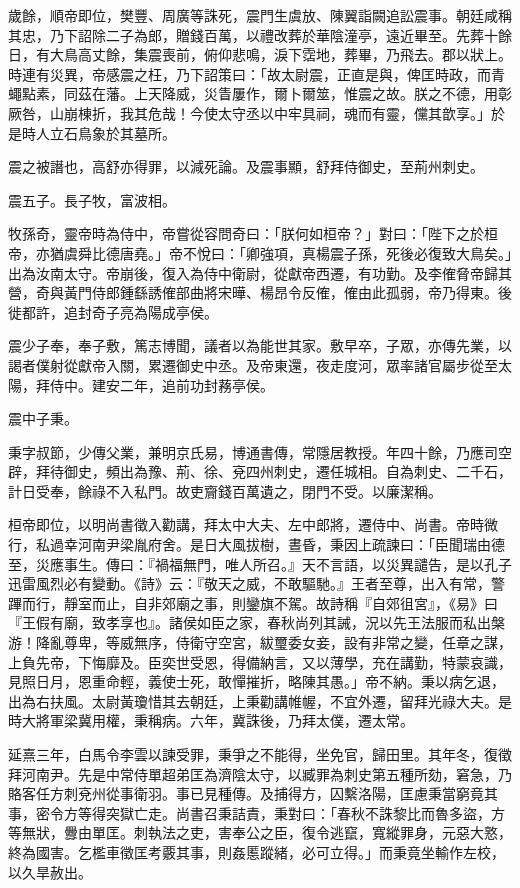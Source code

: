 \begin{pinyinscope}
歲餘，順帝即位，樊豐、周廣等誅死，震門生虞放、陳翼詣闕追訟震事。朝廷咸稱其忠，乃下詔除二子為郎，贈錢百萬，以禮改葬於華陰潼亭，遠近畢至。先葬十餘日，有大鳥高丈餘，集震喪前，俯仰悲鳴，淚下霑地，葬畢，乃飛去。郡以狀上。時連有災異，帝感震之枉，乃下詔策曰：「故太尉震，正直是與，俾匡時政，而青蠅點素，同茲在藩。上天降威，災眚屢作，爾卜爾筮，惟震之故。朕之不德，用彰厥咎，山崩棟折，我其危哉！今使太守丞以中牢具祠，魂而有靈，儻其歆享。」於是時人立石鳥象於其墓所。

震之被譖也，高舒亦得罪，以減死論。及震事顯，舒拜侍御史，至荊州刺史。

震五子。長子牧，富波相。

牧孫奇，靈帝時為侍中，帝嘗從容問奇曰：「朕何如桓帝？」對曰：「陛下之於桓帝，亦猶虞舜比德唐堯。」帝不悅曰：「卿強項，真楊震子孫，死後必復致大鳥矣。」出為汝南太守。帝崩後，復入為侍中衛尉，從獻帝西遷，有功勤。及李傕脅帝歸其營，奇與黃門侍郎鍾繇誘傕部曲將宋曄、楊昂令反傕，傕由此孤弱，帝乃得東。後徙都許，追封奇子亮為陽成亭侯。

震少子奉，奉子敷，篤志博聞，議者以為能世其家。敷早卒，子眾，亦傳先業，以謁者僕射從獻帝入關，累遷御史中丞。及帝東還，夜走度河，眾率諸官屬步從至太陽，拜侍中。建安二年，追前功封蓩亭侯。

震中子秉。

秉字叔節，少傳父業，兼明京氏易，博通書傳，常隱居教授。年四十餘，乃應司空辟，拜待御史，頻出為豫、荊、徐、兗四州刺史，遷任城相。自為刺史、二千石，計日受奉，餘祿不入私門。故吏齎錢百萬遺之，閉門不受。以廉潔稱。

桓帝即位，以明尚書徵入勸講，拜太中大夫、左中郎將，遷侍中、尚書。帝時微行，私過幸河南尹梁胤府舍。是日大風拔樹，晝昏，秉因上疏諫曰：「臣聞瑞由德至，災應事生。傳曰：『禍福無門，唯人所召。』天不言語，以災異譴告，是以孔子迅雷風烈必有變動。《詩》云：『敬天之威，不敢驅馳。』王者至尊，出入有常，警蹕而行，靜室而止，自非郊廟之事，則鑾旗不駕。故詩稱『自郊徂宮』，《易》曰『王假有廟，致孝享也』。諸侯如臣之家，春秋尚列其誡，況以先王法服而私出槃游！降亂尊卑，等威無序，侍衛守空宮，紱璽委女妾，設有非常之變，任章之謀，上負先帝，下悔靡及。臣奕世受恩，得備納言，又以薄學，充在講勤，特蒙哀識，見照日月，恩重命輕，義使士死，敢憚摧折，略陳其愚。」帝不納。秉以病乞退，出為右扶風。太尉黃瓊惜其去朝廷，上秉勸講帷幄，不宜外遷，留拜光祿大夫。是時大將軍梁冀用權，秉稱病。六年，冀誅後，乃拜太僕，遷太常。

延熹三年，白馬令李雲以諫受罪，秉爭之不能得，坐免官，歸田里。其年冬，復徵拜河南尹。先是中常侍單超弟匡為濟陰太守，以臧罪為刺史第五種所劾，窘急，乃賂客任方刺兗州從事衛羽。事已見種傳。及捕得方，囚繫洛陽，匡慮秉當窮竟其事，密令方等得突獄亡走。尚書召秉詰責，秉對曰：「春秋不誅黎比而魯多盜，方等無狀，釁由單匡。刺執法之吏，害奉公之臣，復令逃竄，寬縱罪身，元惡大憝，終為國害。乞檻車徵匡考覈其事，則姦慝蹤緒，必可立得。」而秉竟坐輸作左校，以久旱赦出。


\end{pinyinscope}
